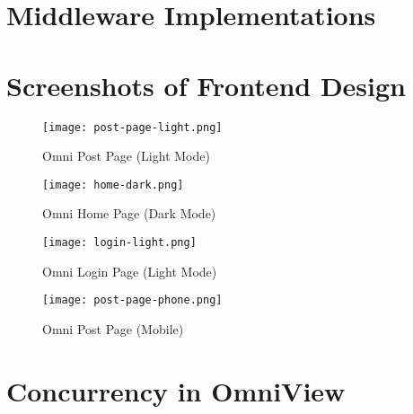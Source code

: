 \appendix
\label{sec:appendix}

\chapter{Middleware Implementations}
\label{sec:apdx-middleware-implementations}





\chapter{Screenshots of Frontend Design}
\label{sec:apdx-screenshots}

\begin{figure}[htbp]
\texttt{[image: post-page-light.png]}
\centering
\caption{Omni Post Page (Light Mode)}
\end{figure}

\begin{figure}[t]
\texttt{[image: home-dark.png]}
\centering
\caption{Omni Home Page (Dark Mode)}
\end{figure}

\begin{figure}[b]
\texttt{[image: login-light.png]}
\centering
\caption{Omni Login Page (Light Mode)}
\end{figure}

\begin{figure}[htbp]
\texttt{[image: post-page-phone.png]}
\centering
\caption{Omni Post Page (Mobile)}
\end{figure}

\chapter{Concurrency in OmniView}
\label{sec:apdx-concurrency-omni-view}


